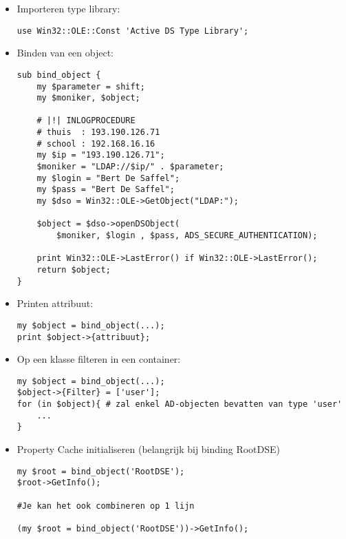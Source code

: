 \documentclass{report}
\begin{document}
\lstset{
    language=perl
}

\begin{itemize}
    \item Importeren type library:
    \begin{lstlisting}
use Win32::OLE::Const 'Active DS Type Library';
    \end{lstlisting}
    \item Binden van een object:
    \begin{lstlisting}
sub bind_object {
    my $parameter = shift;
    my $moniker, $object;

    # |!| INLOGPROCEDURE    
    # thuis  : 193.190.126.71
    # school : 192.168.16.16
    my $ip = "193.190.126.71";
    $moniker = "LDAP://$ip/" . $parameter; 
    my $login = "Bert De Saffel";
    my $pass = "Bert De Saffel";
    my $dso = Win32::OLE->GetObject("LDAP:");

    $object = $dso->openDSObject(
        $moniker, $login , $pass, ADS_SECURE_AUTHENTICATION);

    print Win32::OLE->LastError() if Win32::OLE->LastError();
    return $object;
}

    \end{lstlisting}

    \item Printen attribuut:
    \begin{lstlisting}
my $object = bind_object(...);
print $object->{attribuut};
    \end{lstlisting}

    \item Op een klasse filteren in een container:
    \begin{lstlisting}
my $object = bind_object(...);
$object->{Filter} = ['user'];
for (in $object){ # zal enkel AD-objecten bevatten van type 'user'
    ...
}
    \end{lstlisting}

    \item Property Cache initialiseren (belangrijk bij binding RootDSE)
    \begin{lstlisting}
my $root = bind_object('RootDSE');
$root->GetInfo();

#Je kan het ook combineren op 1 lijn

(my $root = bind_object('RootDSE'))->GetInfo();
    \end{lstlisting}


\end{itemize}
\end{document}
